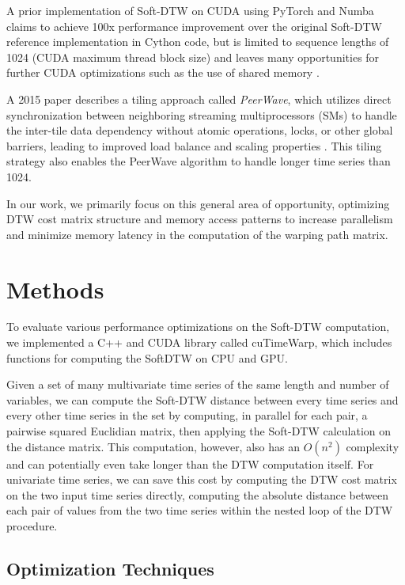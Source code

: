 \documentclass[12pt, letterpaper]{article}
\begin{document}
A prior implementation of Soft-DTW on CUDA using PyTorch and Numba claims to
achieve 100x performance improvement over the original Soft-DTW reference
implementation in Cython code, but is limited to sequence lengths of 1024 (CUDA
maximum thread block size) and leaves many opportunities for further CUDA
optimizations such as the use of shared memory
\cite{maghoumi_pytorch-softdtw-cuda_2021}.

A 2015 paper describes a tiling approach called \emph{PeerWave}, which utilizes
direct synchronization between neighboring streaming multiprocessors (SMs) to
handle the inter-tile data dependency without atomic operations, locks, or other
global barriers, leading to improved load balance and scaling properties
\cite{belviranli_peerwave_2015}. This tiling strategy also enables the PeerWave
algorithm to handle longer time series than 1024.

In our work, we primarily focus on this general area of opportunity, optimizing
DTW cost matrix structure and memory access patterns to increase parallelism and
minimize memory latency in the computation of the warping path matrix.

\section{Methods}

To evaluate various performance optimizations on the Soft-DTW computation, we
implemented a C++ and CUDA library called cuTimeWarp, which includes functions
for computing the SoftDTW on CPU and GPU.

Given a set of many multivariate time series of the same length and number of
variables, we can compute the Soft-DTW distance between every time series and
every other time series in the set by computing, in parallel for each pair, a
pairwise squared Euclidian matrix, then applying the Soft-DTW calculation on the
distance matrix. This computation, however, also has an $O(n^2)$ complexity and
can potentially even take longer than the DTW computation itself. For univariate
time series, we can save this cost by computing the DTW cost matrix on the two
input time series directly, computing the absolute distance between each pair of
values from the two time series within the nested loop of the DTW procedure.

\subsection{Optimization Techniques}
\end{document}
